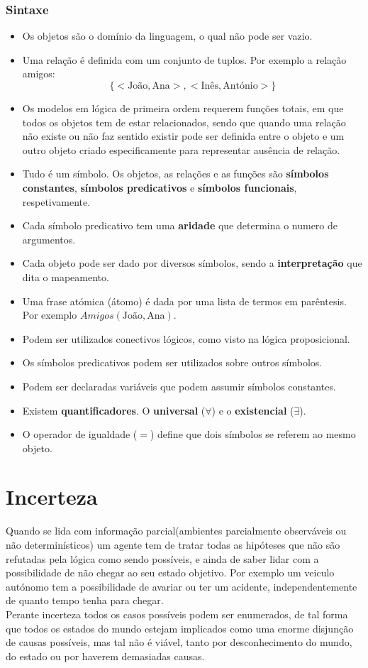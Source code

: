 \documentclass[]{report}
\begin{document}
\subsection{Sintaxe}
\begin{itemize}
\item Os objetos são o domínio da linguagem, o qual não pode ser vazio.
\item Uma relação é definida com um conjunto de tuplos. Por exemplo a relação amigos:
$$\{<\text{João}, \text{Ana}>, <\text{Inês}, \text{António}>\}$$
\item Os modelos em lógica de primeira ordem requerem funções totais, em que todos os objetos tem de estar relacionados, sendo que quando uma relação não existe ou não faz sentido existir pode ser definida entre o objeto e um outro objeto criado especificamente para representar ausência de relação.
\item Tudo é um símbolo. Os objetos, as relações e as funções são \textbf{símbolos constantes}, \textbf{símbolos predicativos} e \textbf{símbolos funcionais}, respetivamente.
\item Cada símbolo predicativo tem uma \textbf{aridade} que determina o numero de argumentos.
\item Cada objeto pode ser dado por diversos símbolos, sendo a \textbf{interpretação} que dita o mapeamento.
\item Uma frase atómica (átomo) é dada por uma lista de termos em parêntesis. Por exemplo $Amigos(\text{João}, \text{Ana})$.
\item Podem ser utilizados conectivos lógicos, como visto na lógica proposicional.
\item Os símbolos predicativos podem ser utilizados sobre outros símbolos.
\item Podem ser declaradas variáveis que podem assumir símbolos constantes.
\item Existem \textbf{quantificadores}. O \textbf{universal} ($\forall$) e o \textbf{existencial} ($\exists$).
\item O operador de igualdade ($=$) define que dois símbolos se referem ao mesmo objeto.
\end{itemize}
\chapter{Incerteza}
Quando se lida com informação parcial(ambientes parcialmente observáveis ou não determinísticos) um agente tem de tratar todas as hipóteses que não são refutadas pela lógica como sendo possíveis, e ainda de saber lidar com a possibilidade de não chegar ao seu estado objetivo. Por exemplo um veiculo autónomo tem a possibilidade de avariar ou ter um acidente, independentemente de quanto tempo tenha para chegar.\\[0.2cm]
Perante incerteza todos os casos possíveis podem ser enumerados, de tal forma que todos os estados do mundo estejam implicados como uma enorme disjunção de causas possíveis, mas tal não é viável, tanto por desconhecimento do mundo, do estado ou por haverem demasiadas causas.
\end{document}
